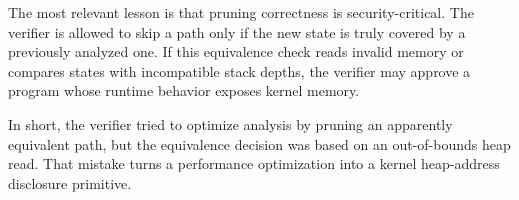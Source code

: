 \documentclass[../main.tex]{subfiles}
\begin{document}
The most relevant lesson is that pruning correctness is security-critical. The verifier is allowed to skip a path only if the new state is truly covered by a previously analyzed one. If this equivalence check reads invalid memory or compares states with incompatible stack depths, the verifier may approve a program whose runtime behavior exposes kernel memory.

In short, the verifier tried to optimize analysis by pruning an apparently equivalent path, but the equivalence decision was based on an out-of-bounds heap read. That mistake turns a performance optimization into a kernel heap-address disclosure primitive.
\end{document}

